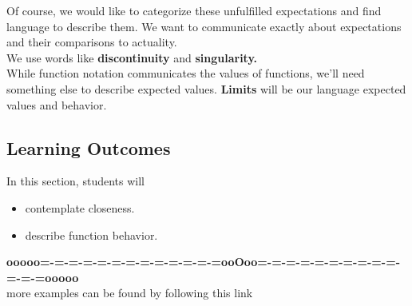 \documentclass{ximera}
\begin{document}
Of course, we would like to categorize these unfulfilled expectations and find language to describe them. We want to communicate exactly about expectations and their comparisons to actuality. \\


We use words like \textbf{\textcolor{purple!85!blue}{discontinuity}} and \textbf{\textcolor{purple!85!blue}{singularity.}} \\


While function notation communicates the values of functions, we'll need something else to describe expected values. \textbf{\textcolor{purple!85!blue}{Limits}} will be our language expected values and behavior.





\subsection{Learning Outcomes}


\begin{sectionOutcomes}
In this section, students will 

\begin{itemize}
\item contemplate closeness.
\item describe function behavior.
\end{itemize}
\end{sectionOutcomes}















\begin{center}
\textbf{\textcolor{green!50!black}{ooooo=-=-=-=-=-=-=-=-=-=-=-=-=ooOoo=-=-=-=-=-=-=-=-=-=-=-=-=ooooo}} \\

more examples can be found by following this link\\ 

\end{center}
\end{document}
